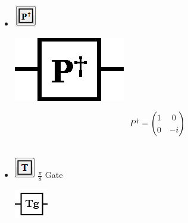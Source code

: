 \documentclass[10pt]{article}
\theoremstyle{definition}
\begin{document}
\begin{itemize}
\item \includegraphics{Figures/Gates/PAdjointGate.png} 

\begin{center}
\includegraphics[scale=.7]{Figures/Gates/PAdjointGateViewer} \\
\begin{minipage}{.9\linewidth}
    \begin{equation*} \label{mat:PGateAdjoint}
    \renewcommand{\arraystretch}{1.25}
P^\dagger = \begin{pmatrix} 1 & 0 \\ 0 & -i \end{pmatrix}
    \end{equation*}
  \end{minipage}\hspace{-2.5cm}
  \begin{minipage}{.2\linewidth}
  \vspace*{3pt}
    \begin{align}
    \end{align}
  \end{minipage}
\end{center}

\item \includegraphics{Figures/Gates/TGate.png}  $\frac{\pi}{8}$ Gate

\begin{center}
\includegraphics[scale=.7]{Figures/Gates/TGateViewer} \\


\end{center}
\end{itemize}
\end{document}
